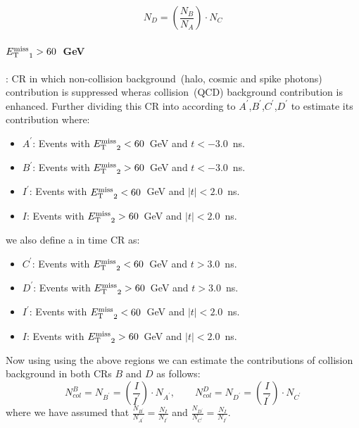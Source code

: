 \begin{equation}
N_{D} = \left(\frac{N_{B}}{N_{A}} \right)\cdot N_{C}
\end{equation}

\paragraph*{${E_{\mathrm{T}}^{\text{miss}}}_{1} > 60$~GeV }: CR in which non-collision background~(halo, cosmic and spike photons) contribution is suppressed wheras collision~(QCD) background contribution is enhanced.
Further dividing this CR into according to $A^{\prime}$,$B^{\prime}$,$C^{\prime}$,$D^{\prime}$ to estimate its contribution where:
\begin{itemize}
\item $A^{\prime}$: Events with ${E_{\mathrm{T}}^{\text{miss}}}_{2} < 60$~GeV and $t < -3.0$~ns.
\item $B^{\prime}$: Events with ${E_{\mathrm{T}}^{\text{miss}}}_{2} > 60$~GeV and $t < -3.0$~ns.
\item $I^{\prime}$: Events with ${E_{\mathrm{T}}^{\text{miss}}}_{2} < 60$~GeV and $|t| < 2.0$~ns.
\item $I$: Events with ${E_{\mathrm{T}}^{\text{miss}}}_{2} > 60$~GeV and $|t| < 2.0$~ns.
\end{itemize}
we also define a in time CR as:
\begin{itemize}
\item $C^{\prime}$: Events with ${E_{\mathrm{T}}^{\text{miss}}}_{2} < 60$~GeV and $t >  3.0$~ns.
 \item $D^{\prime}$: Events with ${E_{\mathrm{T}}^{\text{miss}}}_{2} > 60$~GeV and $t >  3.0$~ns.
 \item $I^{\prime}$: Events with ${E_{\mathrm{T}}^{\text{miss}}}_{2} < 60$~GeV and $|t| < 2.0$~ns.
\item $I$: Events with ${E_{\mathrm{T}}^{\text{miss}}}_{2} > 60$~GeV and $|t| < 2.0$~ns.
\end{itemize}

Now using using the above regions we can estimate the contributions of collision background in both CRs $B$ and $D$ as follows:
\begin{equation}
\displaystyle{N^{B}_{col} = N_{B^{\prime}}  = \left( \frac{I}{I^{\prime}} \right)\cdot N_{A^{\prime}}}, \quad \quad
\displaystyle{N^{D}_{col} = N_{D^{\prime}}  = \left( \frac{I}{I^{\prime}} \right)\cdot N_{C^{\prime}}}
\end{equation}
where we have assumed that $\frac{N_{B^{\prime}}}{N_{A^{\prime}}}  = \frac{N_{I}}{N_{I^{\prime}}}$ and  $\frac{N_{D^{\prime}}}{N_{C^{\prime}}}  = \frac{N_{I}}{N_{I^{\prime}}}$.
\newline


